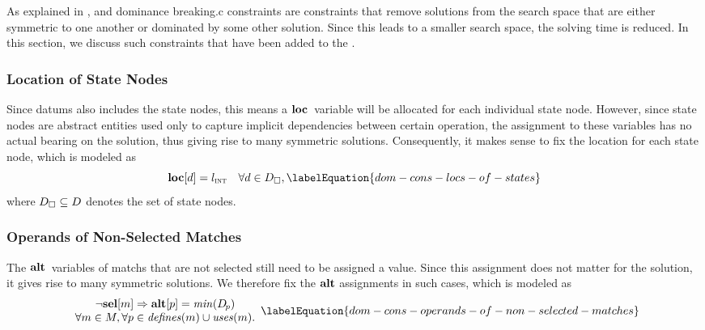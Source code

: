 As explained in ,  and \gls{dominance breaking.c} \glspl{constraint} are
\glspl{constraint} that remove \glspl{solution} from the \gls{search space} that
are either symmetric to one another or dominated by some other \gls{solution}.
%
Since this leads to a smaller \gls{search space}, the solving time is reduced.
%
In this section, we discuss such \glspl{constraint} that have been added to the
.


\subsubsection{Location of State Nodes}

Since \glspl{datum} also includes the \glspl{state node}, this means a
$\mVar{loc}$~\gls{variable} will be allocated for each individual \gls{state
  node}.
%
However, since \glspl{state node} are abstract entities used only to capture
implicit dependencies between certain \gls{operation}, the assignment to these
\glspl{variable} has no actual bearing on the \gls{solution}, thus giving rise
to many symmetric \glspl{solution}.
%
Consequently, it makes sense to fix the \gls{location} for each \gls{state
  node}, which is modeled as
%
\begin{equation}
  \mVar{loc}[d] = \mIntLocation
  \mQuantSep
  \forall d \in \mStateDataSet,
  \labelEquation{dom-cons-locs-of-states}
\end{equation}
%
where \mbox{$\mStateDataSet \subseteq \mDataSet$} denotes the set of
\glspl{state node}.


\subsubsection{Operands of Non-Selected Matches}

The $\mVar{alt}$~\glspl{variable} of \glspl{match} that are not selected still
need to be assigned a value.
%
Since this assignment does not matter for the \gls{solution}, it gives rise to
many symmetric \glspl{solution}.
%
We therefore fix the $\mVar{alt}$ assignments in such cases, which is modeled as
%
\begin{equation}
  \begin{array}{c}
    \neg\mVar{sel}[m] \mImp \mVar{alt}[p] = \mMin(\mDataSet[\hspace{-1pt}p]) \\
    \forall m \in \mMatchSet,
    \forall p \in \mDefines(m) \cup \mUses(m).
  \end{array}
  \labelEquation{dom-cons-operands-of-non-selected-matches}
\end{equation}

